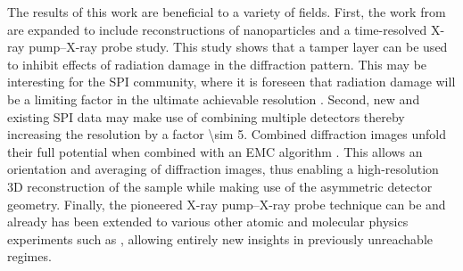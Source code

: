 %
The results of this work are beneficial to a variety of fields. First, the work from \citep{Hoener-2008-JPB,Gorkhover-2016-NatPho} are expanded to include reconstructions of nanoparticles and a time-resolved X-ray pump--X-ray probe study. This study shows that a tamper layer can be used to inhibit effects of radiation damage in the diffraction pattern. This may be interesting for the SPI community, where it is foreseen that radiation damage will be a limiting factor in the ultimate achievable resolution \citep{Aquila-2015-StrucDyn}. Second, new and existing SPI data may make use of combining multiple detectors thereby increasing the resolution by a factor \num{\sim 5}. Combined diffraction images unfold their full potential when combined with an EMC algorithm \citep{Loh-2009-PRE}. This allows an orientation and averaging of diffraction images, thus enabling a high-resolution 3D reconstruction of the sample while making use of the asymmetric detector geometry. Finally, the pioneered X-ray pump--X-ray probe technique can be and already has been extended to various other atomic and molecular physics experiments such as \citep{Picon-2016-NatComm,Lehmann-2016-PRA,Kimberg-2016-FD,Al-Haddad-2017-unpublished,Ferguson-2016-SciAdv}, allowing entirely new insights in previously unreachable regimes.
%
%
%